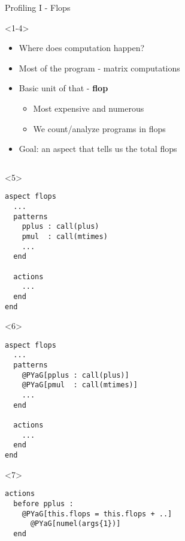 \begin{frame}[fragile]{Profiling I - Flops}
  \begin{onlyenv}<1-4>
    \vspace{4ex}
    \begin{itemize}
    \item Where does computation happen?
    \pause \item Most of the program - matrix computations
    \pause \item Basic unit of that - \textbf{flop}
      \begin{itemize}
      \item Most expensive and numerous
      \item We count/analyze programs in flops
      \end{itemize}
    \pause \item Goal: an aspect that tells us the total flops
    \end{itemize}
  \end{onlyenv}
    \begin{columns}
      \begin{column}[T]{5cm}
        \begin{onlyenv}<5>
          \begin{Verbatim}[commandchars=@\[\]]
aspect flops
  ...
  patterns
    pplus : call(plus)
    pmul  : call(mtimes)
    ...
  end

  actions
    ...
  end
end
        \end{Verbatim}
      \end{onlyenv}
        \begin{onlyenv}<6>
          \begin{Verbatim}[commandchars=@\[\]]
aspect flops
  ...
  patterns
    @PYaG[pplus : call(plus)]
    @PYaG[pmul  : call(mtimes)]
    ...
  end

  actions
    ...
  end
end
        \end{Verbatim}
      \end{onlyenv}
        \begin{onlyenv}<7>
          \begin{Verbatim}[commandchars=@\[\]]
actions
  before pplus : 
    @PYaG[this.flops = this.flops + ..]
      @PYaG[numel(args{1})]
  end
        

\end{Verbatim}
\end{onlyenv}
\end{column}
\end{columns}
\end{frame}
